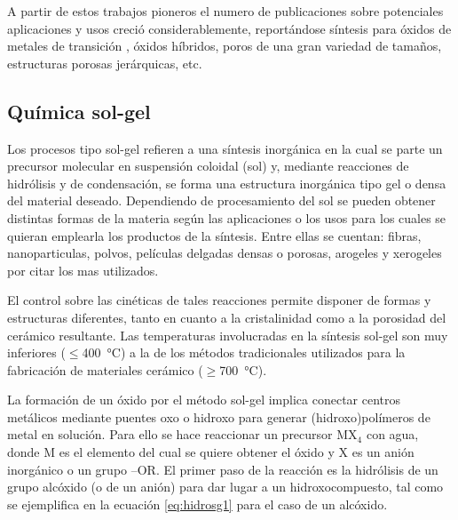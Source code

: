      A partir de estos trabajos pioneros el numero de publicaciones sobre potenciales aplicaciones y usos creció considerablemente, reportándose síntesis para óxidos de metales de transición \cite{Ciesla1996,Ulagappan1996,Antonelli1995}, óxidos híbridos, poros de una gran variedad de tamaños, estructuras porosas jerárquicas, etc.\cite{Soler-Illia2006,Moller1998} %
   
	\subsection{Química sol-gel}

	 Los procesos tipo sol-gel refieren a una síntesis inorgánica en la cual se parte un precursor molecular en suspensión coloidal (sol) y, mediante reacciones de hidrólisis y de condensación, se  forma una estructura inorgánica tipo gel o densa del material deseado. Dependiendo de procesamiento del sol se pueden obtener distintas formas de la materia según las aplicaciones o los usos para los cuales se quieran emplearla los productos de la síntesis. Entre ellas se cuentan: fibras, nanoparticulas, polvos, películas delgadas densas o porosas, arogeles y xerogeles por citar los mas utilizados.

	 El control sobre las cinéticas de tales reacciones permite disponer de formas y estructuras diferentes, tanto en cuanto a la cristalinidad como a la porosidad del cerámico resultante. Las temperaturas involucradas en la síntesis sol-gel son muy inferiores ($\leq$\SI{400}{\celsius}) a la de los métodos tradicionales utilizados para la fabricación de materiales cerámico ($\geq$\SI{700}{\celsius}).\cite{Brinker1990,Jolivet2000,Wright2001}

	 La formación de un óxido por el método sol-gel implica conectar centros metálicos mediante puentes oxo o hidroxo para generar (hidroxo)polímeros de metal en solución. Para ello se hace reaccionar un precursor MX$_4$ con agua, donde M es el elemento del cual se quiere obtener el óxido y X es un anión inorgánico o un grupo –OR. El primer paso de la reacción es la hidrólisis de un grupo alcóxido (o de un anión) para dar lugar a un hidroxocompuesto, tal como se ejemplifica en la ecuación \ref{eq:hidrosg1} para el caso de un alcóxido.
			
